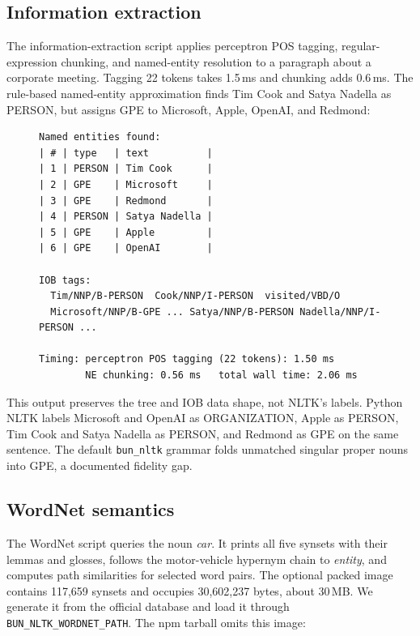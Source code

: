 \documentclass[pdflatex,sn-mathphys-num]{sn-jnl}
\theoremstyle{thmstyleone}
\begin{document}
\subsection{Information extraction}\label{sec:uc-ie}

The information-extraction script applies perceptron POS tagging, regular-expression chunking, and named-entity resolution to a paragraph about a corporate meeting. Tagging 22 tokens takes 1.5\,ms and chunking adds 0.6\,ms. The rule-based named-entity approximation finds Tim Cook and Satya Nadella as PERSON, but assigns GPE to Microsoft, Apple, OpenAI, and Redmond:

\begin{figure}[H]
\begin{lstlisting}[basicstyle=\ttfamily\scriptsize,caption={Captured output of \texttt{paper/usecases/information\_extraction.ts} (abridged).},label={lst:ie}]
Named entities found:
| # | type   | text          |
| 1 | PERSON | Tim Cook      |
| 2 | GPE    | Microsoft     |
| 3 | GPE    | Redmond       |
| 4 | PERSON | Satya Nadella |
| 5 | GPE    | Apple         |
| 6 | GPE    | OpenAI        |

IOB tags:
  Tim/NNP/B-PERSON  Cook/NNP/I-PERSON  visited/VBD/O
  Microsoft/NNP/B-GPE ... Satya/NNP/B-PERSON Nadella/NNP/I-PERSON ...

Timing: perceptron POS tagging (22 tokens): 1.50 ms
        NE chunking: 0.56 ms   total wall time: 2.06 ms
\end{lstlisting}
\end{figure}

This output preserves the tree and IOB data shape, not NLTK's labels. Python NLTK labels Microsoft and OpenAI as ORGANIZATION, Apple as PERSON, Tim Cook and Satya Nadella as PERSON, and Redmond as GPE on the same sentence. The default \texttt{bun\_nltk} grammar folds unmatched singular proper nouns into GPE, a documented fidelity gap.

\subsection{WordNet semantics}\label{sec:uc-wordnet}

The WordNet script queries the noun \emph{car}. It prints all five synsets with their lemmas and glosses, follows the motor-vehicle hypernym chain to \emph{entity}, and computes path similarities for selected word pairs. The optional packed image contains 117{,}659 synsets and occupies 30{,}602{,}237 bytes, about 30\,MB. We generate it from the official database and load it through \texttt{BUN\_NLTK\_WORDNET\_PATH}. The npm tarball omits this image:
\end{document}
